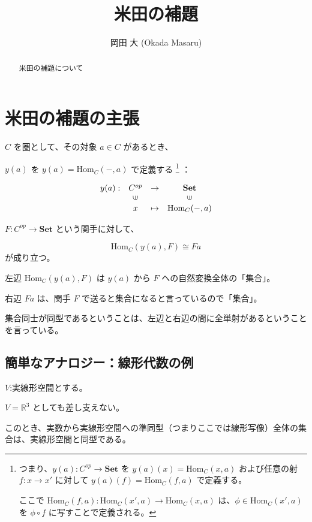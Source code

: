 \documentclass[uplatex,a4j,12pt,dvipdfmx]{jsarticle}
\title{
米田の補題
}
\author{
岡田 大 (Okada Masaru)
}
\begin{document}
\maketitle

\begin{abstract}
	米田の補題について
\end{abstract}

\section{米田の補題の主張}

$C$ を圏として、その対象 $a \in C$ があるとき、

$y(a)$ を $y(a) = \text{Hom}_{C}(-,a)$ で定義する
\footnote{
	つまり、$y(a) : C^{op} \to \textbf{Set}$ を $y(a)(x) = \text{Hom}_{C}(x,a)$ および任意の射 $f: x \to x'$ に対して $y(a)(f) = \text{Hom}_{C}(f,a)$ で定義する。

	ここで $\text{Hom}_{C}(f,a): \text{Hom}_{C}(x',a) \to \text{Hom}_{C}(x,a)$ は、$\phi \in \text{Hom}_{C}(x',a)$ を $\phi \circ f$ に写すことで定義される。
}
：

\[
	\begin{array}{cccc}
		y(a) : & C^{op}                  & \to     & \textbf{Set}            \\
		       & \rotatebox{90}{${\in}$} &         & \rotatebox{90}{${\in}$} \\
		       & x                       & \mapsto & \text{Hom}_{C}(-,a)
	\end{array}
\]


$F: C^{op} \to \textbf{Set}$ という関手に対して、

\[
	\text{Hom}_{C}(y(a),F) \cong Fa
\]
が成り立つ。

左辺
$\text{Hom}_{C}(y(a),F)$
は $y(a)$ から $F$ への自然変換全体の「集合」。

右辺 $Fa$ は、関手 $F$ で送ると集合になると言っているので「集合」。

集合同士が同型であるということは、左辺と右辺の間に全単射があるということを言っている。



\subsection{簡単なアナロジー：線形代数の例}

$V$:実線形空間とする。

$V=\mathbb{R}^{3}$ としても差し支えない。

このとき、実数から実線形空間への準同型（つまりここでは線形写像）全体の集合は、実線形空間と同型である。
\end{document}
